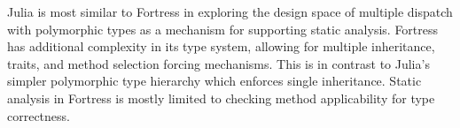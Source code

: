 Julia is most similar to Fortress in exploring the design space of multiple dispatch with polymorphic types as a mechanism for supporting static analysis. Fortress has additional complexity in its type system, allowing for multiple inheritance, traits, and method selection forcing mechanisms.  This is in contrast to Julia's simpler polymorphic type hierarchy which enforces single inheritance. Static analysis in Fortress is mostly limited to checking method applicability for type correctness.



